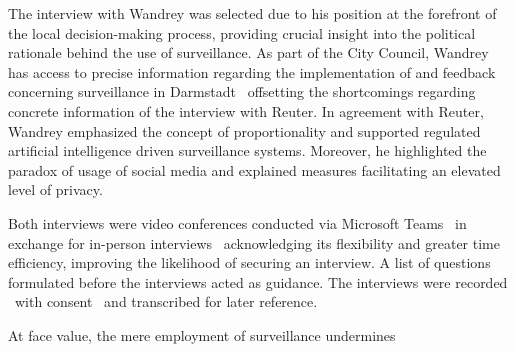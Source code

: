 \documentclass[12pt]{article}
\begin{document}
	The interview with Wandrey was selected due to his position at the forefront of the local decision-making process, providing crucial insight into the political rationale behind the use of surveillance. As part of the City Council, Wandrey has access to precise information regarding the implementation of and feedback concerning surveillance in Darmstadt \textemdash\ offsetting the shortcomings regarding concrete information of the interview with Reuter. In agreement with Reuter, Wandrey emphasized the concept of proportionality and supported regulated artificial intelligence driven surveillance systems. Moreover, he highlighted the paradox of usage of social media and explained measures facilitating an elevated level of privacy.
	
	Both interviews were video conferences conducted via Microsoft Teams \textemdash\ in exchange for in-person interviews \textemdash\ acknowledging its flexibility and greater time efficiency, improving the likelihood of securing an interview. A list of questions formulated before the interviews acted as guidance. The interviews were recorded \textemdash\ with consent \textemdash\ and transcribed for later reference.
	
	At face value, the mere employment of surveillance undermines 
	
	
	
	
	
	
	
		
	
	
	
	
	
	
	
	
	
	\clearpage
	
	\printbibliography
	
\end{document}
